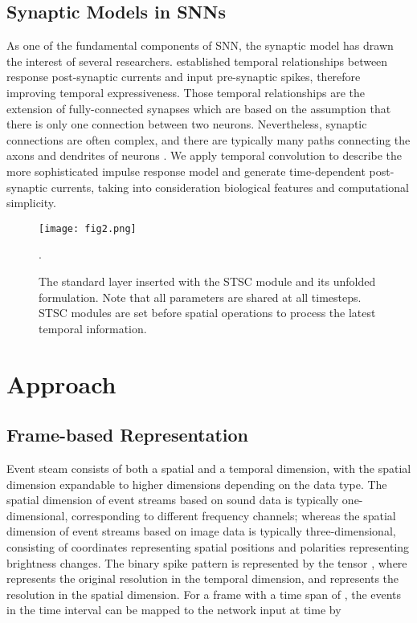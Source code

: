 \documentclass[letterpaper]{article} \usepackage[submission]{aaai23}  \usepackage{times}  \usepackage{helvet}  \usepackage{courier}  \usepackage[hyphens]{url}  \usepackage{graphicx} \urlstyle{rm} \def\UrlFont{\rm}  \usepackage{natbib}  \usepackage{caption} \frenchspacing  \setlength{\pdfpagewidth}{8.5in} \setlength{\pdfpageheight}{11in} \usepackage{algorithm}
\begin{document}
\subsection{Synaptic Models in SNNs}
As one of the fundamental components of SNN, the synaptic model has drawn the interest of several researchers. \cite{shrestha_slayer_2018,fang_exploiting_2020,yu_map-snn_2022} established temporal relationships between response post-synaptic currents and input pre-synaptic spikes, therefore improving temporal expressiveness. Those temporal relationships are the extension of fully-connected synapses
which are based on the assumption that there is only one connection between two neurons.
Nevertheless, synaptic connections are often complex, and there are typically many paths connecting the axons and dendrites of neurons \cite{luo_architectures_nodate,letellier_differential_2019}. 
We apply temporal convolution to describe the more sophisticated impulse response model and generate time-dependent post-synaptic currents, taking into consideration biological features and computational simplicity.

\begin{figure}[t]
\centering
\texttt{[image: fig2.png]} 
\caption{The standard layer inserted with the STSC module and its unfolded formulation. Note that all parameters are shared at all timesteps. STSC modules are set before spatial operations to process the latest temporal information.
}.
\label{fig2}
\end{figure}
\section{Approach}
\subsection{Frame-based Representation}
Event steam consists of both a spatial and a temporal dimension, with the spatial dimension expandable to higher dimensions depending on the data type.
The spatial dimension of event streams based on sound data is typically one-dimensional, corresponding to different frequency channels; whereas the spatial dimension of event streams based on image data is typically three-dimensional, consisting of coordinates representing spatial positions and polarities representing brightness changes.
The binary spike pattern is represented by the tensor , where  represents the original resolution in the temporal dimension, and  represents the resolution in the spatial dimension.
For a frame with a time span of , the events in the time interval  can be mapped to the network input  at time  by
\end{document}
